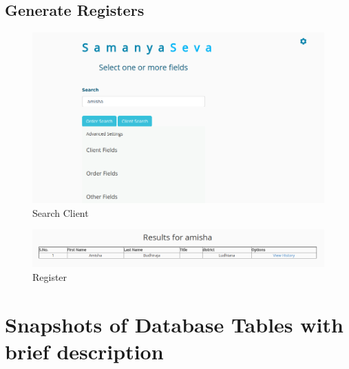 \subsection{Generate Registers}
\begin{figure}[h!]
\centering \includegraphics[scale=0.4]{input/images/search_client.png}
\caption{ Search Client}
\label{fig:UI1}
\end{figure}

\begin{figure}[h!]
\centering \includegraphics[scale=0.4]{input/images/search_result_1.png}
\caption{ Register}
\label{fig:UI1}
\end{figure}
\newpage

\section{Snapshots of Database Tables with brief description}

